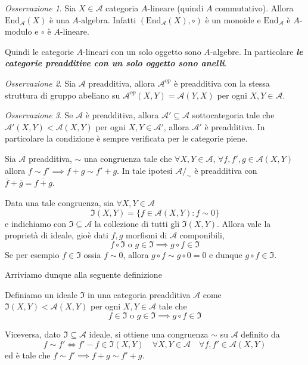\documentclass[notitlepage]{report}
\newcounter{theo}[section]\setcounter{theo}{0}
\numberwithin{equation}{section}
\theoremstyle{plain}
\theoremstyle{definition}
\theoremstyle{remark}
\newtheorem*{remark}{Osservazione}
\begin{document}
\begin{remark}{}
    Sia \(X \in \mathcal{A}\) categoria \(A\)-lineare (quindi \(A\)
    commutativo). Allora \(\mathrm{End}_\mathcal{A}{(X)}\) è una \(A\)-algebra.
    Infatti \({(\mathrm{End}_{\mathcal{A}} {(X)}, \circ)}\) è un monoide e \(\mathrm{End}_\mathcal{A}\) è \(A\)-modulo e \(\circ\) è \(A\)-lineare.

    Quindi le categorie \(A\)-lineari con un solo oggetto sono \(A\)-algebre. In
    particolare \textbf{\emph{le categorie preadditive con un solo oggetto sono anelli}}.
\end{remark}

\begin{remark}{}
Sia \(\mathcal{A}\) preadditiva, allora \(\mathcal{A}^{op}\) è preadditiva con
la stessa struttura di gruppo abeliano su \(\mathcal{A}^{op}{(X, Y)} = \mathcal{A}{(Y, X)}\) per ogni \(X, Y \in \mathcal{A}\).
\end{remark}

\begin{remark}{}
Se \(\mathcal{A}\) è preadditiva, allora \(\mathcal{A}' \subseteq \mathcal{A}\) sottocategoria tale che \(\mathcal{A}'{(X, Y)} < \mathcal{A}{(X,Y)}\) per ogni \(X, Y \in \mathcal{A}'\), allora \(\mathcal{A}'\) è preadditiva. In particolare la condizione è sempre verificata per le categorie piene.
\end{remark}

    Sia \(\mathcal{A}\) preadditiva, \(\sim \) una congruenza tale che \(\forall X, Y \in \mathcal{A}\), \(\forall f, f', g \in \mathcal{A}{(X, Y)}\) allora \(f \sim f' \implies f + g \sim f' + g\). In tale ipotesi \(\mathcal{A}/_\sim \) è preadditiva con \(\overline{f} + \overline{g} = \overline{f+g}\).

    Data una tale congruenza, sia \(\forall X, Y \in \mathcal{A}\) 
    \[
      \mathfrak{I}{(X,Y)} = \{f \in \mathcal{A}{(X, Y)} : f \sim 0\} 
    \]
    e indichiamo con \(\mathfrak{I} \subseteq \mathcal{A}\) la collezione di
    tutti gli \(\mathfrak{I}{(X, Y)}\). Allora vale la proprietà di ideale, gioè
    dati \(f, g\) morfismi di \(\mathcal{A}\) componibili, 
    \[
      f \circ \mathfrak{I} \text{ o } g \in \mathfrak{I} \implies g \circ f \in \mathfrak{I}
    \]
    Se per esempio \(f \in \mathfrak{I}\) ossia \(f \sim 0\), allora \(g \circ f
    \sim g \circ 0 = 0 \) e dunque \(g \circ f \in \mathfrak{I}\).

    Arriviamo dunque alla seguente definizione

\begin{definition}{}
    Definiamo un ideale \(\mathfrak{I}\) in una categoria preadditiva \(\mathcal{A}\) come \(\mathfrak{I}{(X,Y)} < \mathcal{A}{(X,Y)}\) per ogni \(X, Y \in \mathcal{A}\) tale che
    \[
      f \in \mathfrak{I} \text{ o } g \in \mathfrak{I} \implies g \circ f \in
      \mathfrak{I}
    \]
\end{definition}
Viceversa, dato \(\mathfrak{I} \subseteq \mathcal{A} \) ideale, si ottiene una
congruenza \(\sim \) su \(\mathcal{A}\) definito da 
\[
  f \sim f' \iff f' - f \in \mathfrak{I}{(X, Y)} \quad \forall X, Y \in \mathcal{A} \quad \forall f, f' \in  \mathcal{A}{(X, Y)}
\]
ed è tale che \(f \sim f' \implies f + g \sim f'+ g\).
\end{document}
